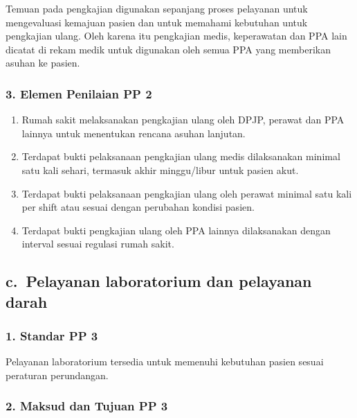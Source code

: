 \documentclass[
]{book}
\providecommand{\tightlist}{%
  \setlength{\itemsep}{0pt}\setlength{\parskip}{0pt}}
\begin{document}
Temuan pada pengkajian digunakan sepanjang proses pelayanan untuk mengevaluasi kemajuan pasien dan untuk memahami kebutuhan untuk pengkajian ulang. Oleh karena itu pengkajian medis, keperawatan dan PPA lain dicatat di rekam medik untuk digunakan oleh semua PPA yang memberikan asuhan ke pasien.

\hypertarget{elemen-penilaian-pp-2}{%
\subsubsection*{3. Elemen Penilaian PP 2}\label{elemen-penilaian-pp-2}}

\begin{enumerate}
\def\labelenumi{\alph{enumi}.}
\tightlist
\item
  Rumah sakit melaksanakan pengkajian ulang oleh DPJP, perawat dan PPA lainnya untuk menentukan rencana asuhan lanjutan.
\item
  Terdapat bukti pelaksanaan pengkajian ulang medis dilaksanakan minimal satu kali sehari, termasuk akhir minggu/libur untuk pasien akut.
\item
  Terdapat bukti pelaksanaan pengkajian ulang oleh perawat minimal satu kali per shift atau sesuai dengan perubahan kondisi pasien.
\item
  Terdapat bukti pengkajian ulang oleh PPA lainnya dilaksanakan dengan interval sesuai regulasi rumah sakit.
\end{enumerate}

\hypertarget{c.-pelayanan-laboratorium-dan-pelayanan-darah}{%
\subsection*{c.~Pelayanan laboratorium dan pelayanan darah}\label{c.-pelayanan-laboratorium-dan-pelayanan-darah}}

\hypertarget{standar-pp-3}{%
\subsubsection*{1. Standar PP 3}\label{standar-pp-3}}

Pelayanan laboratorium tersedia untuk memenuhi kebutuhan pasien sesuai peraturan perundangan.

\hypertarget{maksud-dan-tujuan-pp-3}{%
\subsubsection*{2. Maksud dan Tujuan PP 3}\label{maksud-dan-tujuan-pp-3}}
\end{document}
